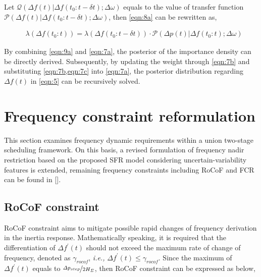 \documentclass[lettersize,journal]{IEEEtran}
\begin{document}
Let \(\mathcal{Q}(\varDelta f(t)|\varDelta f(t_0\!:\!t-\delta t);\varDelta \omega)\) equals to the value of transfer function \(\mathcal{P}(\varDelta f(t)|\varDelta f(t_0\!:\!t-\delta t);\varDelta \omega)\), then \eqref{eqn:8a} can be rewritten as,
\vspace{-0.125in}

\begin{newsubequations}
	\begin{align}
		 & \lambda(\varDelta f(t_0\!:\!t)) = \lambda(\varDelta f(t_0\!:\!t\!-\!\delta t))\cdot \mathcal{P}(\varDelta p(t)|\varDelta f(t_0\!:\!t);\varDelta \omega)\label{eqn:9a}
	\end{align}
\end{newsubequations}

By combining \eqref{eqn:9a} and \eqref{eqn:7a}, the posterior of the importance density can be directly derived. Subsequently, by updating the weight through \eqref{eqn:7b} and
substituting \cref{eqn:7b,eqn:7c} into \eqref{eqn:7a}, the posterior distribution regarding \(\varDelta f(t)\) in \eqref{eqn:5} can be recursively solved.

\vspace{-0.100in} \section{Frequency constraint reformulation} \vspace{-0.0250in}

This section examines frequency dynamic requirements within a union two-stage scheduling framework. On this basis, a revised formulation of frequency nadir restriction based on the proposed SFR model considering uncertain-variability features is extended, remaining frequency constraints including RoCoF and FCR can be found in [].

\vspace{-0.125in}

\subsection{RoCoF constraint}

\vspace{-0.0125in}
RoCoF constraint aims to mitigate possible rapid changes of frequency derivation in the inertia response. Mathematically speaking, it is required that the differentiation of $\varDelta f^{\prime}(t)$ should not exceed the maximum rate of change of frequency, denoted as $\gamma_{rocof}$, \textit{i.e.,} $\varDelta f^{\prime}(t)\!\leq \! \gamma_{rocof}$. Since the maximum of $\varDelta f^{\prime}(t)$ equals to $\nicefrac{\varDelta p_{{step} }}{2 H_{\varSigma}}$, then RoCoF constraint can be expressed as below,
\end{document}
